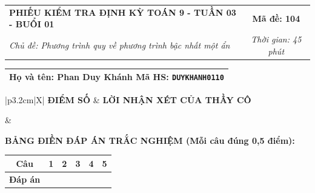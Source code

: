 \documentclass[12pt,a4paper]{article}
\begin{document}
\newpage


\noindent
\begin{tabularx}{\linewidth}{|X|c|}
\hline
\textbf{PHIẾU KIỂM TRA ĐỊNH KỲ TOÁN 9 - TUẦN 03 - BUỔI 01} & \textbf{Mã đề: 104} \\
\textit{Chủ đề: Phương trình quy về phương trình bậc nhất một ẩn} & \textit{Thời gian: 45 phút} \\
\hline
\end{tabularx}

\vspace{1mm}

\noindent
\begin{tabularx}{\linewidth}{|X|}
\hline
\rule[-2mm]{0pt}{7.5mm}\textbf{Họ và tên:} \textbf{\large Phan Duy Khánh} \hfill \textbf{Mã HS:} \texttt{DUYKHANH0110} \quad \\
\hline
\end{tabularx}

\vspace{1mm}

\noindent
\begin{tabularx}{\linewidth}{|p{3.2cm}|X|}
\hline
\centering\textbf{ĐIỂM SỐ} & \centering\textbf{LỜI NHẬN XÉT CỦA THẦY CÔ} \tabularnewline
\hline
\rule{0pt}{1.3cm} & \tabularnewline
\hline
\end{tabularx}

\vspace{1.2mm}

\noindent\textbf{BẢNG ĐIỀN ĐÁP ÁN TRẮC NGHIỆM (Mỗi câu đúng 0,5 điểm):}
\vspace{0.8mm}

\noindent
\renewcommand{\arraystretch}{1.35}
\begin{tabularx}{\linewidth}{|c|*{5}{>{\centering\arraybackslash}X|}}
\hline
\textbf{Câu} & \textbf{1} & \textbf{2} & \textbf{3} & \textbf{4} & \textbf{5} \\
\hline
\textbf{Đáp án} & & & & & \\
\hline
\end{tabularx}
\renewcommand{\arraystretch}{1.0}

\vspace{1.5mm}
\end{document}
